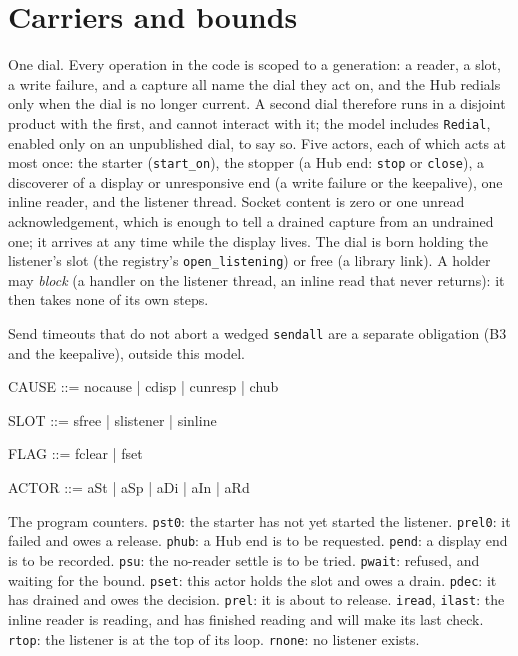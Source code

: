 \documentclass[a4paper,10pt,fleqn]{article}
\begin{document}
\section{Carriers and bounds}

One dial.  Every operation in the code is scoped to a generation: a reader, a
slot, a write failure, and a capture all name the dial they act on, and the Hub
redials only when the dial is no longer current.  A second dial therefore runs
in a disjoint product with the first, and cannot interact with it; the model
includes \texttt{Redial}, enabled only on an unpublished dial, to say so.  Five
actors, each of which acts at most once: the starter (\texttt{start\_on}), the
stopper (a Hub end: \texttt{stop} or \texttt{close}), a discoverer of a display
or unresponsive end (a write failure or the keepalive), one inline reader, and
the listener thread.  Socket content is zero or one unread acknowledgement,
which is enough to tell a drained capture from an undrained one; it arrives at
any time while the display lives.  The dial is born holding the listener's slot
(the registry's \texttt{open\_listening}) or free (a library link).  A holder may
\emph{block} (a handler on the listener thread, an inline read that never
returns): it then takes none of its own steps.

Send timeouts that do not abort a wedged \texttt{sendall} are a separate
obligation (B3 and the keepalive), outside this model.

\begin{zed}
  CAUSE ::= nocause | cdisp | cunresp | chub
\end{zed}

\begin{zed}
  SLOT ::= sfree | slistener | sinline
\end{zed}

\begin{zed}
  FLAG ::= fclear | fset
\end{zed}

\begin{zed}
  ACTOR ::= aSt | aSp | aDi | aIn | aRd
\end{zed}

The program counters.  \texttt{pst0}: the starter has not yet started the
listener.  \texttt{prel0}: it failed and owes a release.  \texttt{phub}: a Hub
end is to be requested.  \texttt{pend}: a display end is to be recorded.
\texttt{psu}: the no-reader settle is to be tried.  \texttt{pwait}: refused, and
waiting for the bound.  \texttt{pset}: this actor holds the slot and owes a
drain.  \texttt{pdec}: it has drained and owes the decision.  \texttt{prel}: it
is about to release.  \texttt{iread}, \texttt{ilast}: the inline reader is
reading, and has finished reading and will make its last check.  \texttt{rtop}:
the listener is at the top of its loop.  \texttt{rnone}: no listener exists.
\end{document}
